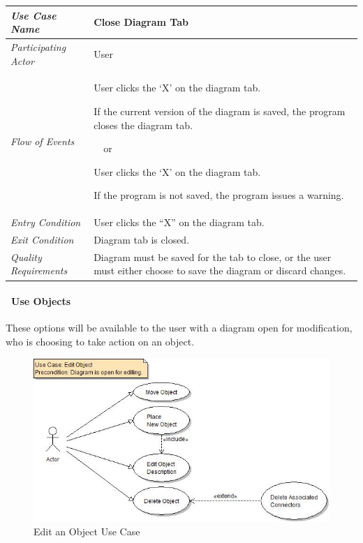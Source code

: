 \documentclass[twoside,letterpaper]{article}
\newenvironment{my_enumerate}{
\begin{enumerate}
  \setlength{\itemsep}{1pt}
  \setlength{\parskip}{0pt}
  \setlength{\parsep}{0pt}}{\end{enumerate}
}
\begin{document}
\begin{flushleft}
\tablehead{}
\begin{tabular}{|m{2.0in} m{5.0in}|}
\hline
{\bfseries\emph{Use Case Name}}
& {\bfseries Close Diagram Tab}
\\\hline
\emph{Participating Actor}
& User
\\\hline
\emph{Flow of Events}
& \begin{my_enumerate}
\item User clicks the `X' on the diagram tab.
\item If the current version of the diagram is saved, the program closes the diagram tab.
\end{my_enumerate}
\ ~or
\begin{my_enumerate}
\item User clicks the `X' on the diagram tab.
\item If the program is not saved, the program issues a warning.
\end{my_enumerate}
\\\hline
\emph{Entry Condition}
& User clicks the ``X'' on the diagram tab.
\\\hline
\emph{Exit Condition}
& Diagram tab is closed.
\\\hline
\emph{Quality Requirements}
& Diagram must be saved for the tab to close, or the user must either choose to save the diagram or discard changes.
\\\hline
\end{tabular}
\end{flushleft}
\bigskip

\clearpage


\paragraph[\ Use Objects]
{\ Use Objects} 
{These options will be available to the user with a diagram open for modification, who is choosing to take action on an object.}

\begin{figure}[h]
\centering
\includegraphics[width=6.0in]{ucaseEditObj.jpg}
\caption{Edit an Object Use Case}
\end{figure}
\end{document}
